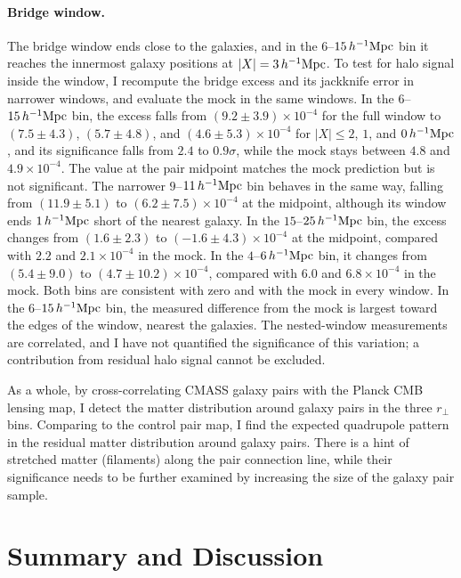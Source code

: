 \documentclass[11pt,letterpaper]{article}
\newcommand{\hinvMpc}{h^{-1}{\rm Mpc}}
\begin{document}
\paragraph{Bridge window.} The bridge window ends close to the galaxies, and
in the $6$--$15\,\hinvMpc$ bin it reaches the innermost galaxy positions at
$|X|=3\,\hinvMpc$. To test for halo signal inside the window, I recompute
the bridge excess and its jackknife error in narrower windows, and evaluate
the mock in the same windows. In the $6$--$15\,\hinvMpc$ bin, the excess
falls from $(9.2\pm3.9)\times10^{-4}$ for the full window to $(7.5\pm4.3)$,
$(5.7\pm4.8)$, and $(4.6\pm5.3)\times10^{-4}$ for $|X|\leq2$, $1$, and
$0\,\hinvMpc$, and its significance falls from $2.4$ to $0.9\sigma$, while
the mock stays between $4.8$ and $4.9\times10^{-4}$. The value at the pair
midpoint matches the mock prediction but is not significant. The narrower
$9$--$11\,\hinvMpc$ bin behaves in the same way, falling from
$(11.9\pm5.1)$ to $(6.2\pm7.5)\times10^{-4}$ at the midpoint, although its
window ends $1\,\hinvMpc$ short of the nearest galaxy. In the
$15$--$25\,\hinvMpc$ bin, the excess changes from $(1.6\pm2.3)$ to
$(-1.6\pm4.3)\times10^{-4}$ at the midpoint, compared with $2.2$ and
$2.1\times10^{-4}$ in the mock. In the $4$--$6\,\hinvMpc$ bin, it changes
from $(5.4\pm9.0)$ to $(4.7\pm10.2)\times10^{-4}$, compared with $6.0$ and
$6.8\times10^{-4}$ in the mock. Both bins are consistent with zero and with
the mock in every window. In the $6$--$15\,\hinvMpc$ bin, the measured
difference from the mock is largest toward the edges of the window, nearest
the galaxies. The nested-window measurements are correlated, and I have not
quantified the significance of this variation; a contribution from residual
halo signal cannot be excluded.

\medskip
\medskip

As a whole, by cross-correlating CMASS galaxy pairs with the Planck CMB lensing map, I detect the matter distribution around galaxy pairs in the three $r_{\perp}$ bins. Comparing to the control pair map, I find the expected quadrupole pattern in the residual matter distribution around galaxy pairs. There is a hint of stretched matter (filaments) along the pair connection line, while their significance needs to be further examined by increasing the size of the galaxy pair sample.

\section{Summary and Discussion}
\label{sec:discussion}
\end{document}
